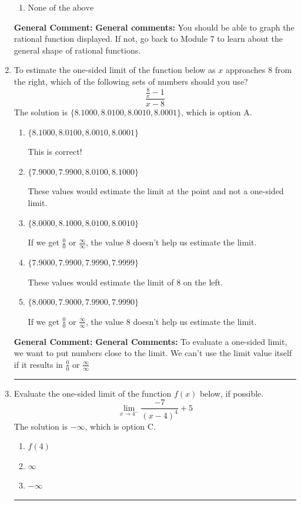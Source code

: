 \documentclass{extbook}[14pt]
\newcommand{\litem}[1]{\item #1

\rule{\textwidth}{0.4pt}}
\begin{document}
\begin{enumerate}
{\begin{enumerate}[label=\Alph*.]
\item \( \text{None of the above} \)


\end{enumerate}

\textbf{General Comment:} \textbf{General comments:} You should be able to graph the rational function displayed. If not, go back to Module 7 to learn about the general shape of rational functions.
}
\litem{
To estimate the one-sided limit of the function below as $x$ approaches 8 from the right, which of the following sets of numbers should you use?
\[ \frac{\frac{8}{x} - 1}{x - 8} \]The solution is \( \{ 8.1000, 8.0100, 8.0010, 8.0001 \} \), which is option A.\begin{enumerate}[label=\Alph*.]
\item \( \{ 8.1000, 8.0100, 8.0010, 8.0001 \} \)

This is correct!
\item \( \{ 7.9000, 7.9900, 8.0100, 8.1000 \} \)

These values would estimate the limit at the point and not a one-sided limit.
\item \( \{ 8.0000, 8.1000, 8.0100, 8.0010 \} \)

If we get $\frac{0}{0}$ or $\frac{\infty}{\infty}$, the value 8 doesn't help us estimate the limit.
\item \( \{ 7.9000, 7.9900, 7.9990, 7.9999 \} \)

These values would estimate the limit of 8 on the left.
\item \( \{ 8.0000, 7.9000, 7.9900, 7.9990 \} \)

If we get $\frac{0}{0}$ or $\frac{\infty}{\infty}$, the value 8 doesn't help us estimate the limit.
\end{enumerate}

\textbf{General Comment:} \textbf{General Comments:} To evaluate a one-sided limit, we want to put numbers close to the limit. We can't use the limit value itself if it results in $\frac{0}{0}$ or $\frac{\infty}{\infty}$
}
\litem{
Evaluate the one-sided limit of the function $f(x)$ below, if possible.
\[ \lim_{x \rightarrow 4^-} \frac{-7}{(x-4)^4}+5 \]The solution is \( -\infty \), which is option C.\begin{enumerate}[label=\Alph*.]
\item \( f(4) \)


\item \( \infty \)


\item \( -\infty \)



\end{enumerate}}
\end{enumerate}
\end{document}

